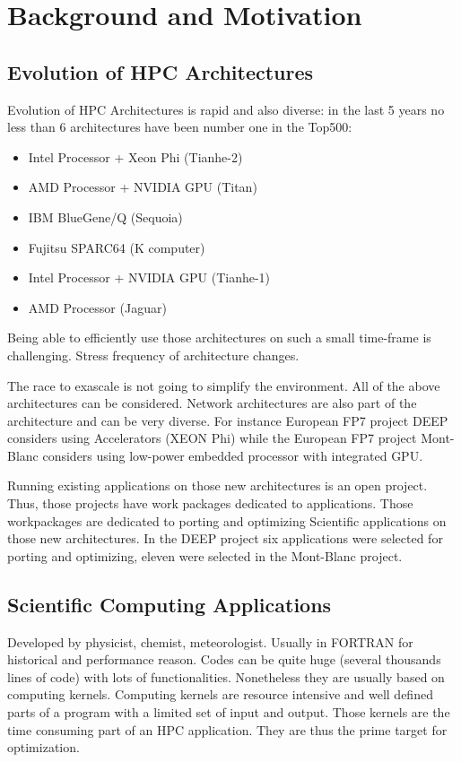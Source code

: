 \documentclass[11pt, a4paper, twoside]{montblanc}
\begin{document}
\section{Background and Motivation}



  \subsection{Evolution of HPC Architectures}

Evolution of HPC Architectures is rapid and also diverse: in the last 5
years no less than 6 architectures have been number one in the Top500:
\begin{itemize}
\item Intel Processor + Xeon Phi (Tianhe-2)
\item AMD Processor + NVIDIA GPU (Titan)
\item IBM BlueGene/Q (Sequoia)
\item Fujitsu SPARC64 (K computer)
\item Intel Processor + NVIDIA GPU (Tianhe-1)
\item AMD Processor (Jaguar)
\end{itemize}
Being able to efficiently use those architectures on such a small
time-frame is challenging. Stress frequency of architecture changes.

The race to exascale is not going to simplify the environment. All of the above
architectures can be considered. Network architectures are also part of the
architecture and can be very diverse.  For instance European FP7 project DEEP
considers using Accelerators (XEON Phi) while the European FP7 project
Mont-Blanc considers using low-power embedded processor with integrated GPU.

Running existing applications on those new architectures is an open project.
Thus, those projects have work packages dedicated to applications. Those
workpackages are dedicated to porting and optimizing Scientific applications on
those new architectures. In the DEEP project six applications were selected for
porting and optimizing, eleven were selected in the Mont-Blanc project.
 
  \subsection{Scientific Computing Applications}

Developed by physicist, chemist, meteorologist. Usually in FORTRAN for
historical and performance reason. Codes can be quite huge (several
thousands lines of code) with lots of functionalities. Nonetheless they are
usually based on computing kernels. Computing kernels are resource
intensive and well defined parts of a program with a limited set of input
and output. Those kernels are the time consuming part of an HPC
application. They are thus the prime target for optimization.
\end{document}
